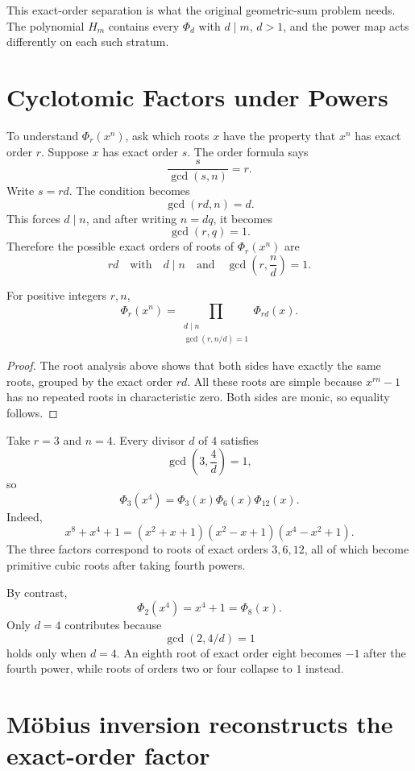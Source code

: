 This exact-order separation is what the original geometric-sum problem needs.  The polynomial \(H_m\) contains every \(\Phi_d\) with \(d\mid m\), \(d>1\), and the power map acts differently on each such stratum.

\section{Cyclotomic Factors under Powers}

To understand \(\Phi_r(x^n)\), ask which roots \(x\) have the property that \(x^n\) has exact order \(r\).  Suppose \(x\) has exact order \(s\).  The order formula says
\[
  \frac{s}{\gcd(s,n)}=r.
\]
Write \(s=rd\).  The condition becomes
\[
  \gcd(rd,n)=d.
\]
This forces \(d\mid n\), and after writing \(n=dq\), it becomes
\[
  \gcd(r,q)=1.
\]
Therefore the possible exact orders of roots of \(\Phi_r(x^n)\) are
\[
  rd
  \quad\text{with}\quad
  d\mid n
  \quad\text{and}\quad
  \gcd\left(r,\frac nd\right)=1.
\]

\begin{theorem}
For positive integers \(r,n\),
\[
  \boxed{
  \Phi_r(x^n)
  =
  \prod_{\substack{d\mid n\\
  \gcd(r,n/d)=1}}
  \Phi_{rd}(x).}
\]
\end{theorem}

\begin{proof}
The root analysis above shows that both sides have exactly the same roots, grouped by the exact order \(rd\).  All these roots are simple because \(x^{rn}-1\) has no repeated roots in characteristic zero.  Both sides are monic, so equality follows.
\end{proof}

Take \(r=3\) and \(n=4\).  Every divisor \(d\) of \(4\) satisfies
\[
  \gcd\left(3,\frac4d\right)=1,
\]
so
\[
  \Phi_3(x^4)
  =\Phi_3(x)\Phi_6(x)\Phi_{12}(x).
\]
Indeed,
\[
  x^8+x^4+1
  =(x^2+x+1)(x^2-x+1)(x^4-x^2+1).
\]
The three factors correspond to roots of exact orders \(3,6,12\), all of which become primitive cubic roots after taking fourth powers.

By contrast,
\[
  \Phi_2(x^4)=x^4+1=\Phi_8(x).
\]
Only \(d=4\) contributes because
\[
  \gcd(2,4/d)=1
\]
holds only when \(d=4\).  An eighth root of exact order eight becomes \(-1\) after the fourth power, while roots of orders two or four collapse to \(1\) instead.

\section{Möbius inversion reconstructs the exact-order factor}

